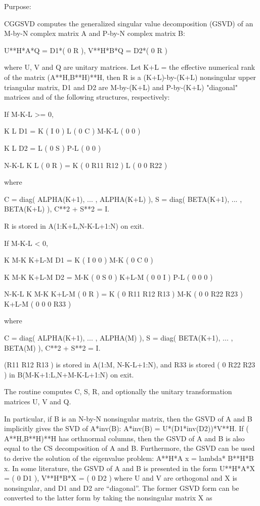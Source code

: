 \begin{DoxyParagraph}{Purpose\+: }
\begin{DoxyVerb} CGGSVD computes the generalized singular value decomposition (GSVD)
 of an M-by-N complex matrix A and P-by-N complex matrix B:

       U**H*A*Q = D1*( 0 R ),    V**H*B*Q = D2*( 0 R )

 where U, V and Q are unitary matrices.
 Let K+L = the effective numerical rank of the
 matrix (A**H,B**H)**H, then R is a (K+L)-by-(K+L) nonsingular upper
 triangular matrix, D1 and D2 are M-by-(K+L) and P-by-(K+L) "diagonal"
 matrices and of the following structures, respectively:

 If M-K-L >= 0,

                     K  L
        D1 =     K ( I  0 )
                 L ( 0  C )
             M-K-L ( 0  0 )

                   K  L
        D2 =   L ( 0  S )
             P-L ( 0  0 )

                 N-K-L  K    L
   ( 0 R ) = K (  0   R11  R12 )
             L (  0    0   R22 )

 where

   C = diag( ALPHA(K+1), ... , ALPHA(K+L) ),
   S = diag( BETA(K+1),  ... , BETA(K+L) ),
   C**2 + S**2 = I.

   R is stored in A(1:K+L,N-K-L+1:N) on exit.

 If M-K-L < 0,

                   K M-K K+L-M
        D1 =   K ( I  0    0   )
             M-K ( 0  C    0   )

                     K M-K K+L-M
        D2 =   M-K ( 0  S    0  )
             K+L-M ( 0  0    I  )
               P-L ( 0  0    0  )

                    N-K-L  K   M-K  K+L-M
   ( 0 R ) =     K ( 0    R11  R12  R13  )
               M-K ( 0     0   R22  R23  )
             K+L-M ( 0     0    0   R33  )

 where

   C = diag( ALPHA(K+1), ... , ALPHA(M) ),
   S = diag( BETA(K+1),  ... , BETA(M) ),
   C**2 + S**2 = I.

   (R11 R12 R13 ) is stored in A(1:M, N-K-L+1:N), and R33 is stored
   ( 0  R22 R23 )
   in B(M-K+1:L,N+M-K-L+1:N) on exit.

 The routine computes C, S, R, and optionally the unitary
 transformation matrices U, V and Q.

 In particular, if B is an N-by-N nonsingular matrix, then the GSVD of
 A and B implicitly gives the SVD of A*inv(B):
                      A*inv(B) = U*(D1*inv(D2))*V**H.
 If ( A**H,B**H)**H has orthnormal columns, then the GSVD of A and B is also
 equal to the CS decomposition of A and B. Furthermore, the GSVD can
 be used to derive the solution of the eigenvalue problem:
                      A**H*A x = lambda* B**H*B x.
 In some literature, the GSVD of A and B is presented in the form
                  U**H*A*X = ( 0 D1 ),   V**H*B*X = ( 0 D2 )
 where U and V are orthogonal and X is nonsingular, and D1 and D2 are
 ``diagonal''.  The former GSVD form can be converted to the latter
 form by taking the nonsingular matrix X as


\end{DoxyVerb}
\end{DoxyParagraph}

